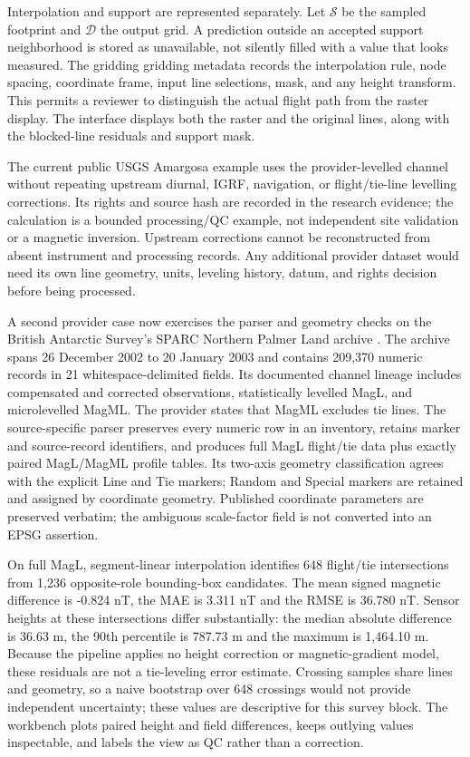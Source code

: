 Interpolation and support are represented separately. Let $\mathcal{S}$
be the sampled footprint and $\mathcal{D}$ the output grid. A prediction
outside an accepted support neighborhood is stored as unavailable,
not silently filled with a value that looks measured. The gridding
gridding metadata records the interpolation rule, node spacing, coordinate frame,
input line selections, mask, and any height transform. This permits a
reviewer to distinguish the actual flight path from the raster display.
The interface displays both the raster and the original lines, along
with the blocked-line residuals and support mask.

The current public USGS Amargosa example uses the provider-levelled
channel without repeating upstream diurnal, IGRF, navigation, or
flight/tie-line levelling corrections. Its rights and source hash are
recorded in the research evidence; the calculation is a bounded
processing/QC example, not independent site validation or a magnetic
inversion. Upstream corrections cannot be reconstructed from absent
instrument and processing records. Any additional provider dataset would
need its own line geometry, units, leveling history, datum, and rights
decision before being processed.

A second provider case now exercises the parser and geometry checks on the
British Antarctic Survey's SPARC Northern Palmer Land archive
\cite{BASSPARC2020}. The archive spans 26 December 2002 to 20 January 2003
and contains 209,370 numeric records in 21 whitespace-delimited fields. Its
documented channel lineage includes compensated and corrected observations,
statistically levelled MagL, and microlevelled MagML. The provider states that
MagML excludes tie lines. The source-specific parser preserves every numeric
row in an inventory, retains marker and source-record identifiers, and
produces full MagL flight/tie data plus exactly paired MagL/MagML profile
tables. Its two-axis geometry classification agrees with the explicit Line
and Tie markers; Random and Special markers are retained and assigned by
coordinate geometry. Published coordinate parameters are preserved verbatim;
the ambiguous scale-factor field is not converted into an EPSG assertion.

On full MagL, segment-linear interpolation identifies 648 flight/tie
intersections from 1,236 opposite-role bounding-box candidates. The mean
signed magnetic difference is -0.824 nT, the MAE is 3.311 nT and the RMSE is
36.780 nT. Sensor heights at these intersections differ substantially: the
median absolute difference is 36.63 m, the 90th percentile is 787.73 m and
the maximum is 1,464.10 m. Because the pipeline applies no height correction
or magnetic-gradient model, these residuals are not a tie-leveling error
estimate. Crossing samples share lines and geometry, so a naive bootstrap
over 648 crossings would not provide independent uncertainty; these values
are descriptive for this survey block. The workbench plots paired height and
field differences, keeps outlying values inspectable, and labels the view as
QC rather than a correction.

